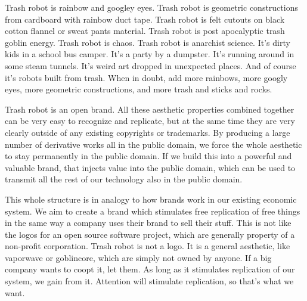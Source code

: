 
Trash robot is rainbow and googley eyes.   Trash robot is geometric constructions from cardboard with rainbow duct tape.   Trash robot is felt cutouts on black cotton flannel or sweat pants material.  Trash robot is post apocalyptic trash goblin energy.   Trash robot is chaos.  Trash robot is anarchist science. It's dirty kids in a school bus camper. It's a party by a dumpster.  It's running around in some steam tunnels.  It's weird art dropped in unexpected places. And of course it's robots built from trash.  When in doubt, add more rainbows, more googly eyes, more geometric constructions, and more trash and sticks and rocks.

Trash robot is an open brand.  All these aesthetic properties combined together can be very easy to recognize and replicate, but at the same time they are very clearly outside of any existing copyrights or trademarks.  By producing a large number of derivative works all in the public domain, we force the whole aesthetic to stay permanently in the public domain. If we build this into a powerful and valuable brand, that injects value into the public domain, which can be used to transmit all the rest of our technology also in the public domain. 

This whole structure is in analogy to how brands work in our existing economic system.  We aim to create a brand which stimulates free replication of free things in the same way a company uses their brand to sell their stuff.  This is not like the logos for an open source software project, which are generally property of a non-profit corporation.  Trash robot is not a logo. It is a general aesthetic, like vaporwave or goblincore, which are simply not owned by anyone.  If a big company wants to coopt it, let them.   As long as it stimulates replication of our system, we gain from it.  Attention will stimulate replication, so that's what we want.  